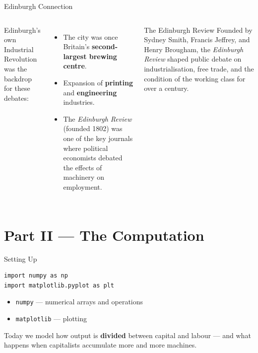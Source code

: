 \documentclass[aspectratio=169, 10pt]{beamer}
\begin{document}
\begin{frame}{Edinburgh Connection}
\begin{columns}[T]
Edinburgh's own Industrial Revolution was the backdrop for these
debates:
\vspace{0.3em}
\begin{itemize}
  \item The city was once Britain's \textbf{second-largest brewing centre}.
  \item Expansion of \textbf{printing} and \textbf{engineering} industries.
  \item The \textit{Edinburgh Review} (founded 1802) was one of the key
        journals where political economists debated the effects of
        machinery on employment.
\end{itemize}
\begin{block}{The Edinburgh Review}
Founded by Sydney Smith, Francis Jeffrey, and Henry Brougham,
the \textit{Edinburgh Review} shaped public debate on
industrialisation, free trade, and the condition of the
working class for over a century.
\end{block}
\end{columns}
\end{frame}

\section{Part II --- The Computation}

\begin{frame}[fragile]{Setting Up}
\begin{lstlisting}
import numpy as np
import matplotlib.pyplot as plt
\end{lstlisting}
\vspace{0.5em}
\begin{itemize}
  \item \texttt{numpy} --- numerical arrays and operations
  \item \texttt{matplotlib} --- plotting
\end{itemize}
\vspace{0.5em}
Today we model how output is \textbf{divided} between capital and
labour --- and what happens when capitalists accumulate more and
more machines.
\end{frame}
\end{document}

